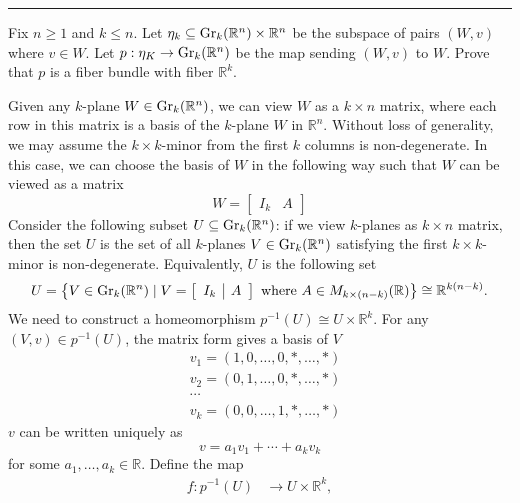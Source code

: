 \documentclass[letterpaper, 12pt]{article}
\begin{document}
\noindent\rule{7in}{2.8pt}
\begin{problem}{3}
Fix \(n\geq 1\) and \(k\leq n\). Let \(\eta_k\subseteq \text{Gr}_k(\mathbb{R}^n)\times \mathbb{R}^n\) be the subspace of pairs \((W,v)\) where \(v\in W\). Let \(p:\eta_K\rightarrow \text{Gr}_k(\mathbb{R}^n)\) be the map sending \((W,v)\) to \(W\). Prove that \(p\) is a fiber bundle with fiber \(\mathbb{R}^k\). 
\end{problem}
\begin{solution}
Given any \(k\)-plane \(W\in \text{Gr}_k(\mathbb{R}^n)\), we can view \(W\) as a \(k\times n\) matrix, where each row in this matrix is a basis of the \(k\)-plane \(W\) in \(\mathbb{R}^n\). Without loss of generality, we may assume the \(k\times k\)-minor from the first \(k\) columns is non-degenerate. In this case, we can choose the basis of \(W\) in the following way such that \(W\) can be viewed as a matrix 
\[W=\left[ \begin{array}{c|c}
   I_k & A
\end{array} \right]\]
Consider the following subset \(U\subseteq \text{Gr}_k(\mathbb{R}^n)\): if we view \(k\)-planes as \(k\times n\) matrix, then the set \(U\) is the set of all \(k\)-planes \(V\in \text{Gr}_k(\mathbb{R}^n)\) satisfying the first \(k\times k\)-minor is non-degenerate. Equivalently, \(U\) is the following set 
\[U=\left\{ V\in \text{Gr}_k(\mathbb{R}^n)\mid V=\left[  \begin{array}{c|c}
    I_k & A
\end{array}\right]\ \text{where}\ A\in M_{k\times (n-k)}(\mathbb{R}) \right\}\cong \mathbb{R}^{k(n-k)}.\]
We need to construct a homeomorphism \(p^{-1}(U)\cong U\times \mathbb{R}^k\). For any \((V,v)\in p^{-1}(U)\), the matrix form gives a basis of \(V\)
\begin{align*}
   &v_1=(1,0,\ldots,0,*,\ldots,*)\\ 
   &v_2=(0,1,\ldots,0,*,\ldots,*)\\
   &\cdots\\ 
   &v_k=(0,0,\ldots,1,*,\ldots,*)
\end{align*}
\(v\) can be written uniquely as 
\[v=a_1v_1+\cdots+a_kv_k\]
for some \(a_1,\ldots,a_k\in \mathbb{R}\). Define the map 
\begin{align*}
   f:p^{-1}(U)&\rightarrow U\times \mathbb{R}^k,\\ 

\end{align*}
\end{solution}
\end{document}
